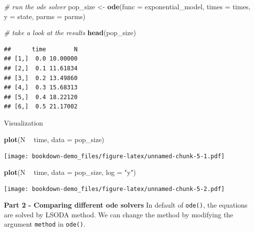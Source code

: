 \documentclass[
]{book}
\newenvironment{Shaded}{\begin{snugshade}}{\end{snugshade}}
\newcommand{\CommentTok}[1]{\textcolor[rgb]{0.56,0.35,0.01}{\textit{#1}}}
\newcommand{\DataTypeTok}[1]{\textcolor[rgb]{0.13,0.29,0.53}{#1}}
\newcommand{\KeywordTok}[1]{\textcolor[rgb]{0.13,0.29,0.53}{\textbf{#1}}}
\newcommand{\NormalTok}[1]{#1}
\newcommand{\OperatorTok}[1]{\textcolor[rgb]{0.81,0.36,0.00}{\textbf{#1}}}
\newcommand{\StringTok}[1]{\textcolor[rgb]{0.31,0.60,0.02}{#1}}
\begin{document}
\begin{Shaded}
\begin{Highlighting}[]
\CommentTok{# run the ode solver}
\NormalTok{pop_size <-}\StringTok{ }\KeywordTok{ode}\NormalTok{(}\DataTypeTok{func =}\NormalTok{ exponential_model, }\DataTypeTok{times =}\NormalTok{ times, }\DataTypeTok{y =}\NormalTok{ state, }\DataTypeTok{parms =}\NormalTok{ parms)}

\CommentTok{# take a look at the results}
\KeywordTok{head}\NormalTok{(pop_size)}
\end{Highlighting}
\end{Shaded}

\begin{verbatim}
##      time        N
## [1,]  0.0 10.00000
## [2,]  0.1 11.61834
## [3,]  0.2 13.49860
## [4,]  0.3 15.68313
## [5,]  0.4 18.22120
## [6,]  0.5 21.17002
\end{verbatim}

Visualization

\begin{Shaded}
\begin{Highlighting}[]
\KeywordTok{plot}\NormalTok{(N }\OperatorTok{~}\StringTok{ }\NormalTok{time, }\DataTypeTok{data =}\NormalTok{ pop_size)}
\end{Highlighting}
\end{Shaded}

\texttt{[image: bookdown-demo\_files/figure-latex/unnamed-chunk-5-1.pdf]}

\begin{Shaded}
\begin{Highlighting}[]
\KeywordTok{plot}\NormalTok{(N }\OperatorTok{~}\StringTok{ }\NormalTok{time, }\DataTypeTok{data =}\NormalTok{ pop_size, }\DataTypeTok{log =} \StringTok{"y"}\NormalTok{)}
\end{Highlighting}
\end{Shaded}

\texttt{[image: bookdown-demo\_files/figure-latex/unnamed-chunk-5-2.pdf]}

\textbf{Part 2 - Comparing different ode solvers}
In default of \texttt{ode()}, the equations are solved by LSODA method. We can change the method by modifying the argument \texttt{method} in \texttt{ode()}.
\end{document}
